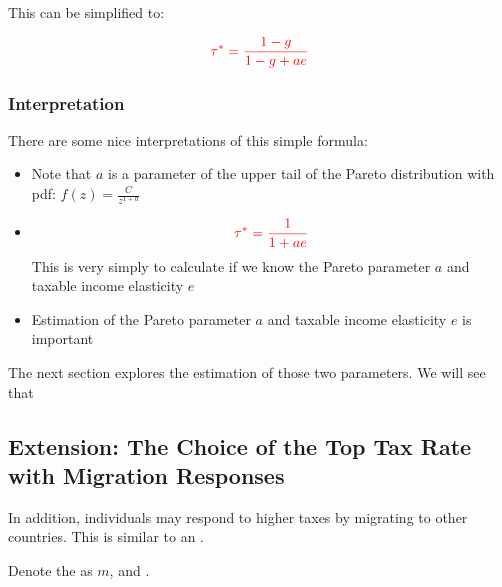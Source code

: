             This can be simplified to:
    
            \begin{equation}
                \color{red}
                \tau^* = \frac{1-g}{1-g+ae}
            \end{equation}

        \subsubsection{Interpretation}

            There are some nice interpretations of this simple formula:
            \begin{itemize}
                \item Note that $a$ is a parameter of the upper tail of the Pareto distribution with pdf: $f(z)=\frac{C}{z^{1+a}}$
                \item {}
                \begin{equation}
                \color{red}
                    \tau^* = \frac{1}{1+ae}
                \end{equation}
                This is very simply to calculate if we know the Pareto parameter $a$ and taxable income elasticity $e$
                \item Estimation of the Pareto parameter $a$ and taxable income elasticity $e$ is important
            \end{itemize}

            The next section explores the estimation of those two parameters. We will see that 

        \subsection{Extension: The Choice of the Top Tax Rate with Migration Responses}

            In addition, individuals may respond to higher taxes by migrating to other countries. This is similar to an .

            Denote the  as $m$, and .

